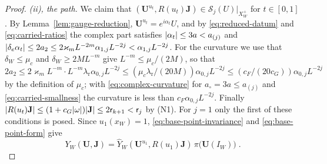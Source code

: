 \documentclass[11pt]{preprint}
\DeclarePairedDelimiter{\abs}{\lvert}{\rvert}
\numberwithin{equation}{section}
\theoremstyle{definition}
\theoremstyle{remark}
\theoremstyle{plain}
\begin{document}
\begin{proof}
\emph{(ii), the path.} We claim that $(\mathbf U^{u_t}, R(u_t)\mathbf J) \in \mathcal S_j(U)|_{X^+_W}$ for $t \in [0, 1]$. By Lemma~\ref{lem:gauge-reduction}, $\mathbf U^{u_t} = e^{i\alpha_t}U$, and by \eqref{eq:reduced-datum} and \eqref{eq:carried-ratios} the complex part satisfies $\abs{\alpha_t} \leq 3a < a_{(j)}$ and $\abs{\delta_e\alpha_t} \leq 2a_2 \leq 2\varkappa_mL^{-2m}\alpha_{1,j}L^{-2j} < \alpha_{1,j}L^{-2j}$. For the curvature we use that $\delta_W \leq \mu_c$ and $\delta_W \geq 2ML^{-m}$ give $L^{-m} \leq \mu_c/(2M)$, so that $2a_2 \leq 2\varkappa_mL^{-m} \cdot L^{-m}\lambda_{\mathrm r}\alpha_{0,j}L^{-2j} \leq (\mu_c\lambda_{\mathrm r}/(20M))\alpha_{0,j}L^{-2j} \leq (c_F/(20c_G))\alpha_{0,j}L^{-2j}$ by the definition of $\mu_c$; with \eqref{eq:complex-curvature} for $a_\circ = 3a \leq a_{(j)}$ and \eqref{eq:carried-smallness} the curvature is less than $c_F\alpha_{0,j}L^{-2j}$. Finally $\abs{R(u_t)\mathbf J} \leq (1 + c_G\abs\omega)\abs{\mathbf J} \leq 2\mathsf r_{k+1} < \mathsf r_j$ by (N1). For $j = 1$ only the first of these conditions is posed. Since $u_1(x_W) = 1$, \eqref{eq:base-point-invariance} and \eqref{eq:base-point-form} give
\begin{equation}\label{eq:carried-identity}
    Y_W(\mathbf U, \mathbf J) = \hat Y_W(\mathbf U^{u_1}, R(u_1)\mathbf J)\,\pi\bigl(\mathbf U(I_W)\bigr)\;.
\end{equation}


\end{proof}
\end{document}
